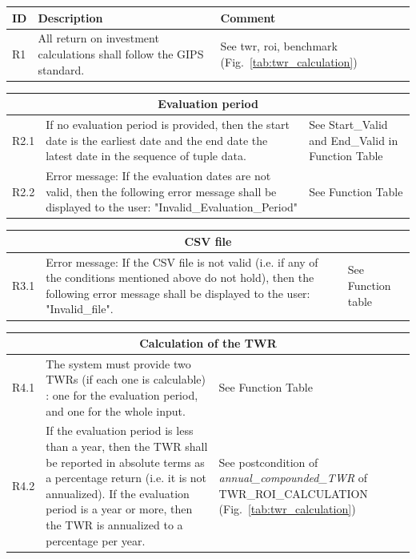 \documentclass[runningheads,12pt]{article}
\begin{document}
{\centering
\begin{longtable}{|l|p{9cm}|p{5cm}|}
\hline
\textbf{ID} & \textbf{Description} & \textbf{Comment}\\

\hline
R1 & All return on investment calculations shall follow the GIPS standard. & See twr, roi, benchmark (Fig.~\ref{tab:twr_calculation}) \\

\hline
\end{longtable}
\centering
\begin{longtable}{|l|p{9cm}|p{5cm}|}
\hline
\multicolumn{3}{|c|}{\textbf{Evaluation period}} \\

\hline
R2.1 & If no evaluation period is provided, then the start date is the earliest date and the end date the latest date in the sequence of tuple data. & See Start\_Valid and End\_Valid in Function Table\\

\hline
R2.2 &  Error message: If the evaluation dates are not valid, then the following error message shall be displayed to the user: "Invalid\_Evaluation\_Period" & See Function Table \\

\hline
\end{longtable}
\centering
\begin{longtable}{|l|p{9cm}|p{5cm}|}

\hline
\multicolumn{3}{|c|}{\textbf{CSV file}} \\

\hline
R3.1 &  Error message: If the CSV file is not valid (i.e. if any of the conditions mentioned above do not hold), then the following error message shall be displayed to the user: "Invalid\_file". & See Function table\\
\hline
\end{longtable}
\centering
\begin{longtable}{|l|p{9cm}|p{5cm}|}

\hline
\multicolumn{3}{|c|}{\textbf{Calculation of the TWR}} \\

\hline
R4.1 & The system must provide two TWRs (if each one is calculable) : one for the evaluation period, and one for the whole input. & See Function Table \\

\hline
R4.2 & If the evaluation period is less than a year, then the TWR shall be reported in absolute terms as a percentage return (i.e. it is not annualized). If the evaluation period is a year or more, then the TWR is annualized to a percentage per year. & See postcondition of  \textit{annual\_compounded\_TWR} of TWR\_ROI\_CALCULATION (Fig.~\ref{tab:twr_calculation})\\


\end{longtable}}
\end{document}
